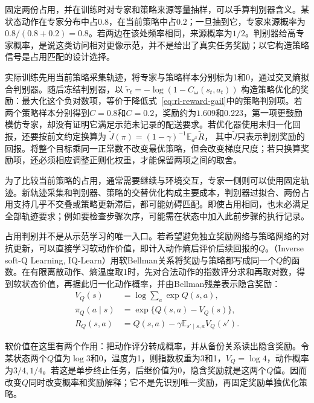 固定两份占用，并在训练时对专家和策略来源等量抽样，可以手算判别器含义。某状态动作在专家分布中占$0.8$，在当前策略中占$0.2$；一旦抽到它，专家来源概率为$0.8/(0.8+0.2)=0.8$。若两边在该处频率相同，来源概率为$1/2$。判别器给高专家概率，是说这类访问相对更像示范，并不是给出了真实任务奖励；以它构造策略信号是占用匹配的设计选择。

实际训练先用当前策略采集轨迹，将专家与策略样本分别标为1和0，通过交叉熵拟合判别器。随后冻结判别器，以
$\widetilde r_t=-\log(1-C_{\bm{\omega}}(s_t,a_t))$
构造策略优化的奖励：最大化这个负对数项，等价于降低式~\eqref{eq:rl-reward-gail}中的策略判别项。若两个策略样本分别得到$C=0.8$和$C=0.2$，奖励约为$1.609$和$0.223$，第一项更鼓励模仿专家，却没有证明它满足示范未记录的配送要求。若优化器使用未归一化回报，还要按前文约定换算为
$\widetilde J(\pi)=(1-\gamma)^{-1}\mathbb E_{d^\pi}\widetilde R$，
其中$\widetilde J$只表示判别奖励的回报。将整个目标乘同一正常数不改变最优策略，但会改变梯度尺度；若只换算奖励项，还必须相应调整正则化权重，才能保留两项之间的取舍。

为了比较当前策略的占用，通常需要继续与环境交互，专家一侧则可以使用固定轨迹。新轨迹采集和判别器、策略的交替优化构成主要成本，判别器过拟合、两份占用支持几乎不交叠或策略更新滞后，都可能妨碍匹配。即使占用相同，也未必满足全部轨迹要求；例如要检查步骤次序，可能需在状态中加入此前步骤的执行记录。

占用判别并不是从示范学习的唯一入口。若希望避免独立奖励网络与策略网络的对抗更新，可以直接学习软动作价值，即计入动作熵后评价后续回报的$Q$。（Inverse soft-Q Learning, IQ-Learn）用软Bellman关系将奖励与策略都写成同一个$Q$的函数。在有限离散动作、熵温度取1时，先对合法动作的指数评分求和再取对数，得到软状态价值，再据此归一化动作概率，并由Bellman残差表示隐含奖励：
\begin{equation}
  \begin{aligned}
    V_Q(s)&=\log\sum_a\exp Q(s,a),\\
    \pi_Q(a\mid s)&=\exp\{Q(s,a)-V_Q(s)\},\\
    R_Q(s,a)&=Q(s,a)-\gamma\mathbb E_{s'\mid s,a}V_Q(s').
  \end{aligned}
  \label{eq:rl-reward-iq}
\end{equation}

软价值在这里有两个作用：把动作评分转成概率，并从备份关系读出隐含奖励。令某状态两个$Q$值为$\log3$和0，温度为1，则指数权重为3和1，$V_Q=\log4$，动作概率为$3/4,1/4$。若这是单步终止任务，后继价值为0，隐含奖励就是这两个$Q$值。因而改变$Q$同时改变概率和奖励解释；它不是先识别唯一奖励，再固定奖励单独优化策略。

